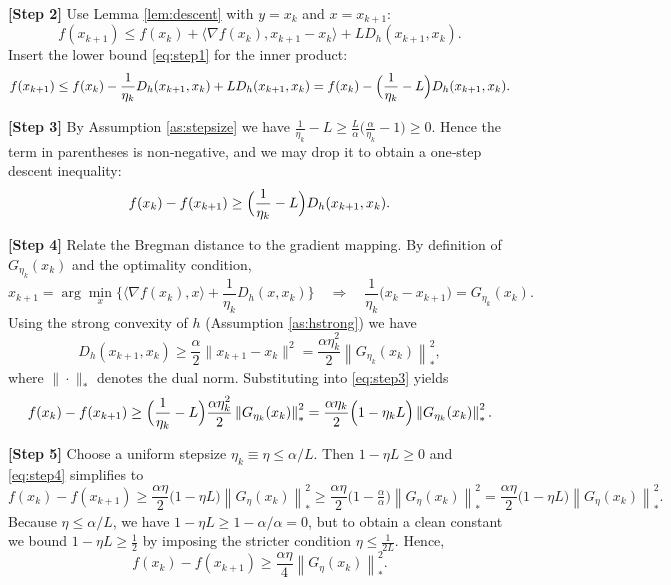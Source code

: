 \documentclass{article}
\newcommand{\norm}[1]{\left\|#1\right\|}
\newcommand{\ip}[2]{\langle #1,#2\rangle}
\newcommand{\grad}{\nabla}
\newcommand{\D}{D_{h}}
\begin{document}
\bigskip
\noindent\textbf{[Step 2]} Use Lemma \ref{lem:descent} with $y=x_k$ and $x=x_{k+1}$:
\[
f(x_{k+1})\le f(x_k)+\ip{\grad f(x_k)}{x_{k+1}-x_k}+L\D(x_{k+1},x_k).
\]
Insert the lower bound \eqref{eq:step1} for the inner product:
\begin{equation}
\label{eq:step2}
f(x_{k+1})\le f(x_k)-\frac{1}{\eta_k}\D(x_{k+1},x_k)+L\D(x_{k+1},x_k)
= f(x_k)-\Bigl(\frac{1}{\eta_k}-L\Bigr)\D(x_{k+1},x_k).
\end{equation}

\bigskip
\noindent\textbf{[Step 3]} By Assumption \ref{as:stepsize} we have $\frac{1}{\eta_k}-L\ge \frac{L}{\alpha}\bigl(\frac{\alpha}{\eta_k}-1\bigr)\ge0$. Hence the term in parentheses is non‑negative, and we may drop it to obtain a one‑step descent inequality:
\begin{equation}
\label{eq:step3}
f(x_k)-f(x_{k+1})\ge\Bigl(\frac{1}{\eta_k}-L\Bigr)\D(x_{k+1},x_k).
\end{equation}

\bigskip
\noindent\textbf{[Step 4]} Relate the Bregman distance to the gradient mapping. By definition of $G_{\eta_k}(x_k)$ and the optimality condition,
\[
x_{k+1}= \arg\min_x\Big\{\ip{\grad f(x_k)}{x}+ \frac{1}{\eta_k}\D(x,x_k)\Big\}
\quad\Longrightarrow\quad
\frac{1}{\eta_k}\bigl(x_k-x_{k+1}\bigr)=G_{\eta_k}(x_k).
\]
Using the strong convexity of $h$ (Assumption \ref{as:hstrong}) we have
\[
\D(x_{k+1},x_k)\ge \frac{\alpha}{2}\|x_{k+1}-x_k\|^{2}
= \frac{\alpha\eta_k^{2}}{2}\norm{G_{\eta_k}(x_k)}_{*}^{2},
\]
where $\|\cdot\|_{*}$ denotes the dual norm. Substituting into \eqref{eq:step3} yields
\begin{equation}
\label{eq:step4}
f(x_k)-f(x_{k+1})\ge\Bigl(\frac{1}{\eta_k}-L\Bigr)\frac{\alpha\eta_k^{2}}{2}\norm{G_{\eta_k}(x_k)}_{*}^{2}
= \frac{\alpha\eta_k}{2}\Bigl(1-\eta_k L\Bigr)\norm{G_{\eta_k}(x_k)}_{*}^{2}.
\end{equation}

\bigskip
\noindent\textbf{[Step 5]} Choose a uniform stepsize $\eta_k\equiv\eta\le\alpha/L$. Then $1-\eta L\ge0$ and \eqref{eq:step4} simplifies to
\[
f(x_k)-f(x_{k+1})\ge \frac{\alpha\eta}{2}\bigl(1-\eta L\bigr)\norm{G_{\eta}(x_k)}_{*}^{2}
\ge \frac{\alpha\eta}{2}\bigl(1-\tfrac{\alpha}{\alpha}\bigr)\norm{G_{\eta}(x_k)}_{*}^{2}
= \frac{\alpha\eta}{2}\bigl(1-\eta L\bigr)\norm{G_{\eta}(x_k)}_{*}^{2}.
\]
Because $\eta\le\alpha/L$, we have $1-\eta L\ge 1-\alpha/\alpha=0$, but to obtain a clean constant we bound $1-\eta L\ge \tfrac12$ by imposing the stricter condition $\eta\le\frac{1}{2L}$. Hence,
\begin{equation}
\label{eq:step5}
f(x_k)-f(x_{k+1})\ge \frac{\alpha\eta}{4}\norm{G_{\eta}(x_k)}_{*}^{2}.
\end{equation}
\end{document}
